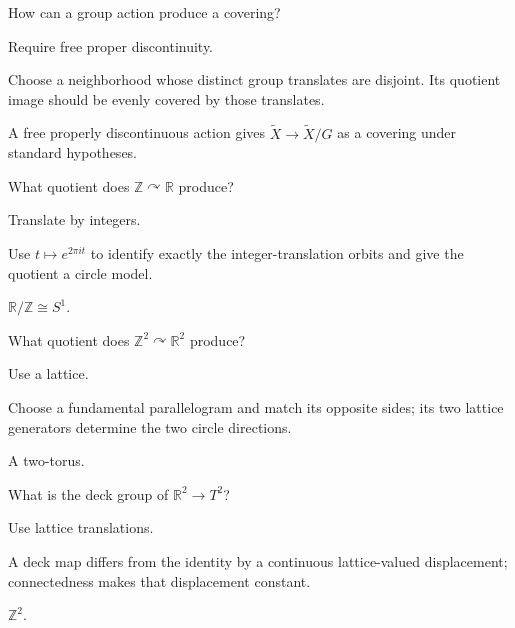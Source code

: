 \begin{exercise}\label{exr:viii12-16}
How can a group action produce a covering?
\end{exercise}
\begin{hint}
Require free proper discontinuity.

Choose a neighborhood whose distinct group translates are disjoint. Its quotient image should be evenly covered by those translates.
\end{hint}
\begin{solution}
A free properly discontinuous action gives \(\widetilde X\to\widetilde X/G\) as a covering under standard hypotheses.
\end{solution}

\begin{exercise}\label{exr:viii12-17}
What quotient does \(\mathbb Z\curvearrowright\mathbb R\) produce?
\end{exercise}
\begin{hint}
Translate by integers.

Use \(t\mapsto e^{2\pi it}\) to identify exactly the integer-translation orbits and give the quotient a circle model.
\end{hint}
\begin{solution}
\(\mathbb R/\mathbb Z\cong S^1\).
\end{solution}

\begin{exercise}\label{exr:viii12-18}
What quotient does \(\mathbb Z^2\curvearrowright\mathbb R^2\) produce?
\end{exercise}
\begin{hint}
Use a lattice.

Choose a fundamental parallelogram and match its opposite sides; its two lattice generators determine the two circle directions.
\end{hint}
\begin{solution}
A two-torus.
\end{solution}

\begin{exercise}\label{exr:viii12-19}
What is the deck group of \(\mathbb R^2\to T^2\)?
\end{exercise}
\begin{hint}
Use lattice translations.

A deck map differs from the identity by a continuous lattice-valued displacement; connectedness makes that displacement constant.
\end{hint}
\begin{solution}
\(\mathbb Z^2\).
\end{solution}

